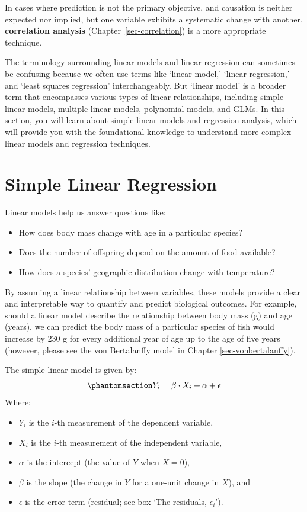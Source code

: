 \documentclass[
  letterpaper,
]{book}
\providecommand{\tightlist}{%
  \setlength{\itemsep}{0pt}\setlength{\parskip}{0pt}}\usepackage{longtable,booktabs,array}
\begin{document}
In cases where prediction is not the primary objective, and causation is
neither expected nor implied, but one variable exhibits a systematic
change with another, \textbf{correlation analysis}
(Chapter~\ref{sec-correlation}) is a more appropriate technique.

The terminology surrounding linear models and linear regression can
sometimes be confusing because we often use terms like `linear model,'
`linear regression,' and `least squares regression' interchangeably. But
`linear model' is a broader term that encompasses various types of
linear relationships, including simple linear models, multiple linear
models, polynomial models, and GLMs. In this section, you will learn
about simple linear models and regression analysis, which will provide
you with the foundational knowledge to understand more complex linear
models and regression techniques.

\section{Simple Linear Regression}\label{sec-simple-linear-regression}

Linear models help us answer questions like:

\begin{itemize}
\tightlist
\item
  How does body mass change with age in a particular species?
\item
  Does the number of offspring depend on the amount of food available?
\item
  How does a species' geographic distribution change with temperature?
\end{itemize}

By assuming a linear relationship between variables, these models
provide a clear and interpretable way to quantify and predict biological
outcomes. For example, should a linear model describe the relationship
between body mass (g) and age (years), we can predict the body mass of a
particular species of fish would increase by 230 g for every additional
year of age up to the age of five years (however, please see the von
Bertalanffy model in Chapter \ref{sec-vonbertalanffy}).

The simple linear model is given by:
\begin{equation}\phantomsection\label{eq-reg1}{Y_{i}=\beta \cdot X_{i}+\alpha+\epsilon}\end{equation}
Where:

\begin{itemize}
\tightlist
\item
  \(Y_{i}\) is the \(i\)-th measurement of the dependent variable,
\item
  \(X_{i}\) is the \(i\)-th measurement of the independent variable,
\item
  \(\alpha\) is the intercept (the value of \(Y\) when \(X=0\)),
\item
  \(\beta\) is the slope (the change in \(Y\) for a one-unit change in
  \(X\)), and
\item
  \(\epsilon\) is the error term (residual; see box `The residuals,
  \(\epsilon_i\)').
\end{itemize}
\end{document}
